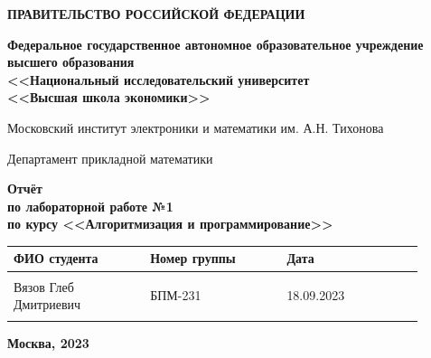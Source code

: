 \documentclass[12pt]{article}
\begin{document}
\thispagestyle{empty}
\begin{center}
\textbf{ПРАВИТЕЛЬСТВО РОССИЙСКОЙ ФЕДЕРАЦИИ}

\vspace{5ex}
	
\textbf{Федеральное государственное автономное образовательное учреждение \\ высшего образования \\ <<Национальный исследовательский университет \\ <<Высшая школа экономики>>}
\end{center}
\vspace{5ex}

\begin{center}
    Московский институт электроники и математики им. А.Н. Тихонова  
    
    \vspace{5ex}
    
    Департамент прикладной математики
    
    \vspace{10ex}
    \textbf{Отчёт \\ по лабораторной работе №1 \\ по курсу <<Алгоритмизация и программирование>>}
	\vspace{7ex}

\end{center}

\begin{center} 
\begin{tabular}{| p{0.3\linewidth}| p{0.3\linewidth}| p{0.3\linewidth}|}
 \hline	
ФИО студента & Номер группы & Дата \\  \hline
 & & \\  
Вязов Глеб \newline Дмитриевич & БПМ-231 & 18.09.2023\\  
 & & \\  \hline		
\end{tabular}
\end{center}

\begin{center}
	\vspace{3ex}
	
	\vfill
   
   \normalsize
    
	\textbf{Москва, 2023}
\end{center}

\newpage

\end{document}
